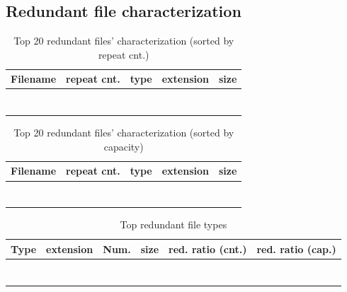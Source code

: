 \subsection{Redundant file characterization}


\begin{table} 
	\centering 
	\scriptsize  
	\caption{Top 20 redundant files' characterization (sorted by repeat cnt.)}
	\label{tbl:top_dup_files_repeat_cnt} 
	\begin{tabular}{|l|l|l|l|l|}%
		\hline 
		Filename & repeat cnt. & type & extension & size \\
		\hline
		&   &   &   &  \\
		\hline
		&   &   &   &   \\
		\hline
		&   &   &  &    \\
		\hline
		&  &  &  & \\
		\hline
		& &  &   & \\
		\hline
		& &  &   & \\
		\hline
		&  &  & & \\
		\hline
	\end{tabular} 
\end{table}

\begin{table} 
	\centering 
	\scriptsize  
	\caption{Top 20 redundant files' characterization (sorted by capacity)} 
	\label{tbl:top_dup_files_cap} 
	\begin{tabular}{|l|l|l|l|l|}%
		\hline 
		Filename & repeat cnt. & type & extension & size \\
		\hline
		&   &   &   &  \\
		\hline
		&   &   &   &   \\
		\hline
		&   &   &  &    \\
		\hline
		&  &  &  & \\
		\hline
		& &  &   & \\
		\hline
		& &  &   & \\
		\hline
		&  &  & & \\
		\hline
	\end{tabular} 
\end{table}


\begin{table} 
	\centering 
	\scriptsize  
	\caption{Top redundant file types} 
	\label{tbl:top_dup_types} 
	\begin{tabular}{|l|l|l|l|l|l|}%
		\hline 
		Type & extension & Num. & size & red. ratio (cnt.)  & red. ratio (cap.)\\
		\hline
		  &   &   &  & &   \\
		\hline
		  &   &   &  & &    \\
		\hline
		  &   &   &   & &   \\
		\hline
		 &  &  &  & & \\
		\hline
		  & &  &  & & \\
		\hline
		  & &  & & &  \\
		\hline
		   &  &  & & &  \\
		\hline
	\end{tabular} 
\end{table} 

